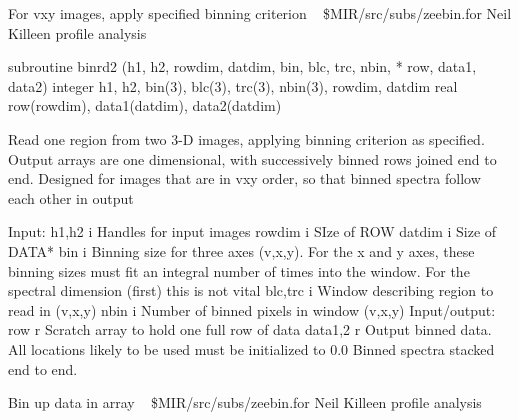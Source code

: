 %
\noindent For vxy images, apply specified binning criterion
\newline \ 
\newline {} \$MIR/src/subs/zeebin.for
\newline {} Neil Killeen
\newline {} profile analysis
\par{\tenpoint
{\eightpoint\begintt
      subroutine binrd2 (h1, h2, rowdim, datdim, bin, blc, trc, nbin, 
     *                   row, data1, data2)
      integer h1, h2, bin(3), blc(3), trc(3), nbin(3), rowdim, datdim
      real row(rowdim), data1(datdim), data2(datdim)

 Read one region from two 3-D images, applying binning criterion 
 as specified.   Output arrays are one dimensional, with 
 successively binned rows joined end to end.  Designed for
 images that are in vxy order, so that binned spectra follow
 each other in output

     Input:
       h1,h2    i    Handles for input images
       rowdim   i    SIze of ROW
       datdim   i    Size of DATA*
       bin      i    Binning size for three axes (v,x,y).  For the x 
                     and y axes, these binning sizes must fit an
                     integral number of times into the window. For
                     the spectral dimension (first) this is not vital
       blc,trc  i    Window describing region to read in (v,x,y)
       nbin     i    Number of binned pixels in window (v,x,y)
     Input/output:
       row      r    Scratch array to hold one full row of data 
       data1,2  r    Output binned data. All locations likely to
                     be used must be initialized to 0.0
                     Binned spectra stacked end to end.
\endtt}
\par}
%
\noindent Bin up data in array
\newline \ 
\newline {} \$MIR/src/subs/zeebin.for
\newline {} Neil Killeen
\newline \abox{Keywords:} profile analysis
